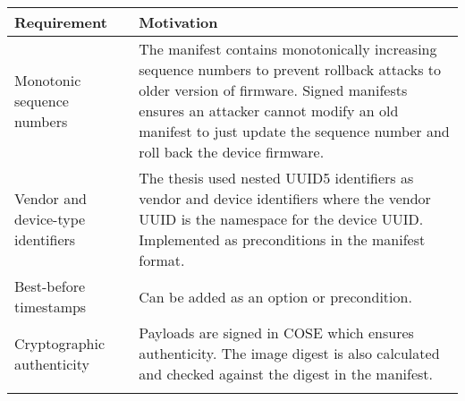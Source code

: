 \begin{longtable}[]{@{}ll@{}}
\toprule
\begin{minipage}[b]{0.37\columnwidth}\raggedright\strut
Requirement\strut
\end{minipage} & \begin{minipage}[b]{0.57\columnwidth}\raggedright\strut
Motivation\strut
\end{minipage}\tabularnewline
\midrule
\endhead
\begin{minipage}[t]{0.37\columnwidth}\raggedright\strut
Monotonic sequence numbers\strut
\end{minipage} & \begin{minipage}[t]{0.57\columnwidth}\raggedright\strut
The manifest contains monotonically increasing sequence numbers to
prevent rollback attacks to older version of firmware. Signed manifests
ensures an attacker cannot modify an old manifest to just update the
sequence number and roll back the device firmware.\strut
\end{minipage}\tabularnewline
\begin{minipage}[t]{0.37\columnwidth}\raggedright\strut
Vendor and device-type identifiers\strut
\end{minipage} & \begin{minipage}[t]{0.57\columnwidth}\raggedright\strut
The thesis used nested UUID5 identifiers as vendor and device
identifiers where the vendor UUID is the namespace for the device UUID.
Implemented as preconditions in the manifest format.\strut
\end{minipage}\tabularnewline
\begin{minipage}[t]{0.37\columnwidth}\raggedright\strut
Best-before timestamps\strut
\end{minipage} & \begin{minipage}[t]{0.57\columnwidth}\raggedright\strut
Can be added as an option or precondition.\strut
\end{minipage}\tabularnewline
\begin{minipage}[t]{0.37\columnwidth}\raggedright\strut
Cryptographic authenticity\strut
\end{minipage} & \begin{minipage}[t]{0.57\columnwidth}\raggedright\strut
Payloads are signed in COSE which ensures authenticity. The image digest
is also calculated and checked against the digest in the manifest.\strut
\end{minipage}\tabularnewline
\begin{minipage}[t]{0.37\columnwidth}\raggedright\strut

\end{minipage}
\end{longtable}
